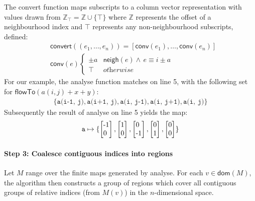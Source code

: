 \documentclass[9pt]{sigplanconf}
\theoremstyle{definition}
\newcommand{\neigh}{\textsf{neigh}}
\newcommand{\vtwo}[2]{\setlength{\arraycolsep}{0em}
\left[\begin{array}{l}$#1$\\$#2$\end{array}\right]}
\begin{document}
The \textsf{convert} function maps subscripts to a column vector
representation with values drawn from $\mathbb{Z}_\top = \mathbb{Z} \cup \{\top\}$
where $\mathbb{Z}$ represents the offset of a neighbourhood index
and $\top$ represents any non-neighbourhood subscripts, defined:
%
\begin{align*}
& \textsf{convert}((e_1, \ldots, e_n)) = [\textsf{conv}(e_1), \ldots,
  \textsf{conv}(e_n)] \\
& \textsf{conv}(e) \begin{cases}
\pm a & \neigh(e) \wedge \, e \equiv i \pm a \\
\top & \textit{otherwise} 
\end{cases} 
\end{align*}
%
For our example, the \textsf{analyse} function matches on
line 5, with the following set for $\textsf{flowTo}(a(i, j) + x +
  y)$:
%
\begin{align*}
\{\texttt{a(i-1, j)}, \texttt{a(i+1, j)}, \texttt{a(i, j-1)},
  \texttt{a(i, j+1)}, \texttt{a(i, j)}\}
\end{align*}
Subsequently the result of \textsf{analyse} on line 5 yields the map:
\begin{align*}
\texttt{a} \mapsto \{\vtwo{-1}{0}, \vtwo{1}{0},
          \vtwo{0}{-1}, \vtwo{0}{1}, \vtwo{0}{0}\}
\end{align*}
%

\paragraph{Step 3: Coalesce contiguous indices into regions}

Let $M$ range over the finite maps generated by \textsf{analyse}.  For
each $v \in \mathsf{dom}(M)$, the algorithm then constructs a group
of regions which cover all contiguous groups of relative indices
(from $M(v)$) in the $n$-dimensional space. 
\end{document}
